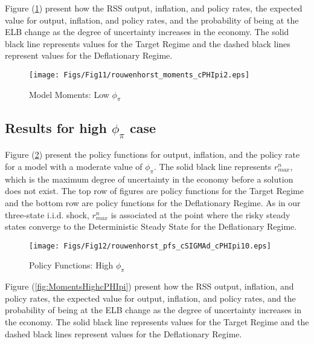 \documentclass[11pt]{article}
\begin{document}
	Figure (\ref{fig:MomentsLowcPHIpi}) present how the RSS output, inflation, and policy rates, the expected value for output, inflation, and policy rates, and the probability of being at the ELB change as the degree of uncertainty increases in the economy. The solid black line represents values for the Target Regime and the dashed black lines represent values for the Deflationary Regime.
	
	\begin{figure}[!ht]
		\begin{center}
			\caption{Model Moments: Low  $\phi_{\pi}$}
			\texttt{[image: Figs/Fig11/rouwenhorst\_moments\_cPHIpi2.eps]}\label{fig:MomentsLowcPHIpi}
		\end{center}
	\end{figure}
	
	
	\subsection{Results for high $\phi_{\pi}$ case}	
	
	Figure (\ref{fig:PFsHighcPHIpi}) present the policy functions for output, inflation, and the policy rate for a model with a moderate value of $\phi_{\pi}$. The solid black line represents $r^n_{max}$, which is the maximum degree of uncertainty in the economy before a solution does not exist. The top row of figures are policy functions for the Target Regime and the bottom row are policy functions for the Deflationary Regime. As in our three-state i.i.d. shock, $r^n_{max}$ is associated at the point where the risky steady states converge to the Deterministic Steady State for the Deflationary Regime. 
	
	\begin{figure}[!ht]
		\begin{center}
			\caption{Policy Functions: High  $\phi_{\pi}$}
			\texttt{[image: Figs/Fig12/rouwenhorst\_pfs\_cSIGMAd\_cPHIpi10.eps]}\label{fig:PFsHighcPHIpi}
		\end{center}
	\end{figure}
	
	Figure (\ref{fig:MomentsHighcPHIpi}) present how the RSS output, inflation, and policy rates, the expected value for output, inflation, and policy rates, and the probability of being at the ELB change as the degree of uncertainty increases in the economy. The solid black line represents values for the Target Regime and the dashed black lines represent values for the Deflationary Regime.
	
\end{document}

